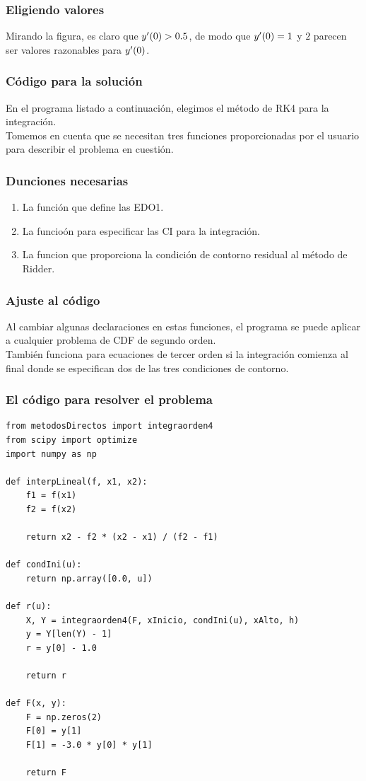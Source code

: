 \documentclass[12pt]{beamer}
\begin{document}
\begin{frame}
\frametitle{Eligiendo valores}
Mirando la figura, es claro que ${y}^{\prime} (0) > 0.5$, de modo que ${y}^{\prime} (0) = 1$ y $2$ parecen ser valores razonables para ${y}^{\prime} (0)$.
\end{frame}
\begin{frame}
\frametitle{Código para la solución}
En el programa listado a continuación, elegimos el método de RK4 para la integración.
\\
\bigskip
\pause
Tomemos en cuenta que se necesitan tres funciones proporcionadas por el usuario para describir el problema en cuestión.
\end{frame}
\begin{frame}
\frametitle{Dunciones necesarias}
\begin{enumerate}[<+->]
\item La función  que define las EDO1.
\item La funcioón  para especificar las CI para la integración.
\item La funcion  que proporciona la condición de contorno residual al método de Ridder.
\end{enumerate}
\end{frame}
\begin{frame}
\frametitle{Ajuste al código}
Al cambiar algunas declaraciones en estas funciones, el programa se puede aplicar a cualquier problema de CDF de segundo orden.
\\
\bigskip
\pause
También funciona para ecuaciones de tercer orden si la integración comienza al final donde se especifican dos de las tres condiciones de contorno.
\end{frame}
\begin{frame}
\frametitle{El código para resolver el problema}
\begin{lstlisting}[caption=Declaración de funciones]
from metodosDirectos import integraorden4
from scipy import optimize
import numpy as np

def interpLineal(f, x1, x2):
    f1 = f(x1)
    f2 = f(x2)

    return x2 - f2 * (x2 - x1) / (f2 - f1)

def condIni(u):
    return np.array([0.0, u])

def r(u):
    X, Y = integraorden4(F, xInicio, condIni(u), xAlto, h)
    y = Y[len(Y) - 1]
    r = y[0] - 1.0
    
    return r

def F(x, y):
    F = np.zeros(2)
    F[0] = y[1]
    F[1] = -3.0 * y[0] * y[1]
    
    return F
\end{lstlisting}
\end{frame}
\end{document}
